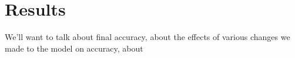 \section{Results}
\label{sec:-res}

We'll want to talk about final accuracy, about the effects of various changes 
we made to the model on accuracy, about  

